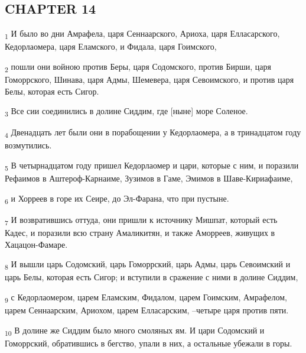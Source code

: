 \subsection{CHAPTER 14}
\begin{tcolorbox}
\textsubscript{1} И было во дни Амрафела, царя Сеннаарского, Ариоха, царя Елласарского, Кедорлаомера, царя Еламского, и Фидала, царя Гоимского,
\end{tcolorbox}
\begin{tcolorbox}
\textsubscript{2} пошли они войною против Беры, царя Содомского, против Бирши, царя Гоморрского, Шинава, царя Адмы, Шемевера, царя Севоимского, и против царя Белы, которая есть Сигор.
\end{tcolorbox}
\begin{tcolorbox}
\textsubscript{3} Все сии соединились в долине Сиддим, где [ныне] море Соленое.
\end{tcolorbox}
\begin{tcolorbox}
\textsubscript{4} Двенадцать лет были они в порабощении у Кедорлаомера, а в тринадцатом году возмутились.
\end{tcolorbox}
\begin{tcolorbox}
\textsubscript{5} В четырнадцатом году пришел Кедорлаомер и цари, которые с ним, и поразили Рефаимов в Аштероф-Карнаиме, Зузимов в Гаме, Эмимов в Шаве-Кириафаиме,
\end{tcolorbox}
\begin{tcolorbox}
\textsubscript{6} и Хорреев в горе их Сеире, до Эл-Фарана, что при пустыне.
\end{tcolorbox}
\begin{tcolorbox}
\textsubscript{7} И возвратившись оттуда, они пришли к источнику Мишпат, который есть Кадес, и поразили всю страну Амаликитян, и также Аморреев, живущих в Хацацон-Фамаре.
\end{tcolorbox}
\begin{tcolorbox}
\textsubscript{8} И вышли царь Содомский, царь Гоморрский, царь Адмы, царь Севоимский и царь Белы, которая есть Сигор; и вступили в сражение с ними в долине Сиддим,
\end{tcolorbox}
\begin{tcolorbox}
\textsubscript{9} с Кедорлаомером, царем Еламским, Фидалом, царем Гоимским, Амрафелом, царем Сеннаарским, Ариохом, царем Елласарским, --четыре царя против пяти.
\end{tcolorbox}
\begin{tcolorbox}
\textsubscript{10} В долине же Сиддим было много смоляных ям. И цари Содомский и Гоморрский, обратившись в бегство, упали в них, а остальные убежали в горы.
\end{tcolorbox}
